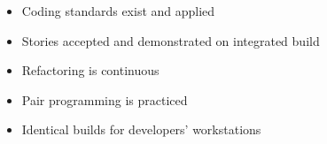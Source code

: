 \begin{appendices}
\begin{itemize}
\begin{itemize}
			\item Coding standards exist and applied
			\item Stories accepted and demonstrated on integrated build
			\item Refactoring is continuous
			\item Pair programming is practiced
			\item Identical builds for developers' workstations
		\end{itemize}
\end{itemize}









\end{appendices}
